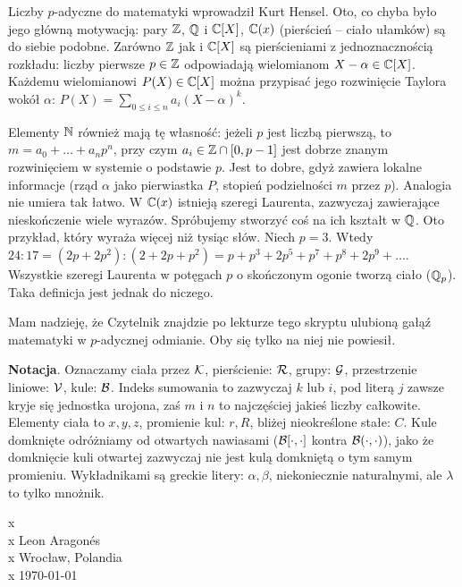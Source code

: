 Liczby $p$-adyczne do matematyki wprowadził Kurt Hensel.
Oto, co chyba było jego główną motywacją: pary $\mathbb Z$, $\mathbb Q$ i $\mathbb C[X]$, $\mathbb C(x)$ (pierścień -- ciało ułamków) są do siebie podobne.
Zarówno $\mathbb Z$ jak i $\mathbb C[X]$ są pierścieniami z jednoznacznością rozkładu: liczby pierwsze $p \in \mathbb Z$ odpowiadają wielomianom $X - \alpha \in \mathbb C[X]$.
Każdemu wielomianowi $P(X) \in \mathbb C[X]$ można przypisać jego rozwinięcie Taylora wokół $\alpha$: $P(X) = \sum_{0 \le i \le n} a_i (X - \alpha)^k$.

Elementy $\mathbb N$ również mają tę własność: jeżeli $p$ jest liczbą pierwszą, to $m = a_0 + \ldots + a_n p^n$, przy czym $a_i \in \mathbb Z \cap [0, p-1]$ jest dobrze znanym rozwinięciem w systemie o podstawie $p$.
Jest to dobre, gdyż zawiera lokalne informacje (rząd $\alpha$ jako pierwiastka $P$, stopień podzielności $m$ przez $p$).
Analogia nie umiera tak łatwo. 
W $\mathbb C(x)$ istnieją szeregi Laurenta, zazwyczaj zawierające nieskończenie wiele wyrazów.
Spróbujemy stworzyć coś na ich kształt w $\mathbb Q$.
Oto przykład, który wyraża więcej niż tysiąc słów.
Niech $p = 3$.
Wtedy $24 : 17 = (2p+2p^2) : (2+2p+p^2) = p + p^3 + 2p^5 + p^7 + p^8 + 2p^9 + \ldots$.
Wszystkie szeregi Laurenta w potęgach $p$ o skończonym ogonie tworzą ciało ($\mathbb Q_p$).
Taka definicja jest jednak do niczego.

Mam nadzieję, że Czytelnik znajdzie po lekturze tego skryptu ulubioną gałąź matematyki w $p$-adycznej odmianie.
Oby się tylko na niej nie powiesił.

\textbf{Notacja}.
Oznaczamy ciała przez $\mathcal K$, pierścienie: $\mathcal R$, grupy: $\mathcal G$, przestrzenie liniowe: $\mathcal V$, kule: $\mathcal B$.
Indeks sumowania to zazwyczaj $k$ lub $i$, pod literą $j$ zawsze kryje się jednostka urojona, zaś $m$ i $n$ to najczęściej jakieś liczby całkowite.
Elementy ciała to $x, y, z$, promienie kul: $r, R$, bliżej nieokreślone stałe: $C$.
Kule domknięte odróżniamy od otwartych nawiasami ($\mathcal B[\cdot, \cdot]$ kontra $\mathcal B(\cdot, \cdot)$), jako że domknięcie kuli otwartej zazwyczaj nie jest kulą domkniętą o tym samym promieniu.
Wykładnikami są greckie litery: $\alpha, \beta$, niekoniecznie naturalnymi, ale $\lambda$ to tylko mnożnik.

{\color{white}x} \hfill \\
{\color{white}x} \hfill Leon Aragonés\\
{\color{white}x} \hfill Wrocław, Polandia\\
{\color{white}x} \hfill \today
\fancyhead[LE, RO]{\nouppercase{\leftmark}}
